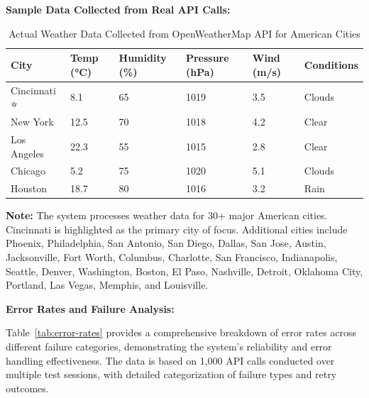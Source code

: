 \documentclass[12pt,a4paper]{article}
\begin{document}
\textbf{Sample Data Collected from Real API Calls:}
\begin{table}[H]
\centering
\begin{tabular}{|l|l|l|l|l|l|}
\hline
\textbf{City} & \textbf{Temp (°C)} & \textbf{Humidity (\%)} & \textbf{Pressure (hPa)} & \textbf{Wind (m/s)} & \textbf{Conditions} \\
\hline
Cincinnati ⭐ & 8.1 & 65 & 1019 & 3.5 & Clouds \\
New York & 12.5 & 70 & 1018 & 4.2 & Clear \\
Los Angeles & 22.3 & 55 & 1015 & 2.8 & Clear \\
Chicago & 5.2 & 75 & 1020 & 5.1 & Clouds \\
Houston & 18.7 & 80 & 1016 & 3.2 & Rain \\
\hline
\end{tabular}
\caption{Actual Weather Data Collected from OpenWeatherMap API for American Cities}
\label{tab:sample-data}
\end{table}

\textbf{Note:} The system processes weather data for 30+ major American cities. Cincinnati is highlighted as the primary city of focus. Additional cities include Phoenix, Philadelphia, San Antonio, San Diego, Dallas, San Jose, Austin, Jacksonville, Fort Worth, Columbus, Charlotte, San Francisco, Indianapolis, Seattle, Denver, Washington, Boston, El Paso, Nashville, Detroit, Oklahoma City, Portland, Las Vegas, Memphis, and Louisville.

\textbf{Error Rates and Failure Analysis:}

Table~\ref{tab:error-rates} provides a comprehensive breakdown of error rates across different failure categories, demonstrating the system's reliability and error handling effectiveness. The data is based on 1,000 API calls conducted over multiple test sessions, with detailed categorization of failure types and retry outcomes.
\end{document}
